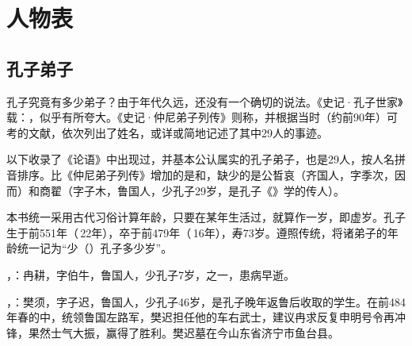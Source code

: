 \chapter*{人\quad 物\quad 表}



\lypdfbookmark\section*{孔子弟子}

孔子究竟有多少弟子？由于年代久远，还没有一个确切的说法。《史记·孔子世家》载：，似乎有所夸大。《史记·仲尼弟子列传》则称，并根据当时（约前90年）可考的文献，依次列出了姓名，或详或简地记述了其中29人的事迹。

以下收录了《论语》中出现过，并基本公认属实的孔子弟子，也是29人，按人名拼音排序。比《仲尼弟子列传》增加的是和，缺少的是公晳哀（齐国人，字季次，因而）和商翟（字子木，鲁国人，少孔子29岁，是孔子《》学的传人）。

本书统一采用古代习俗计算年龄，只要在某年生活过，就算作一岁，即虚岁。孔子生于前551年（\,22年），卒于前479年（\,16年），寿73岁。遵照传统，将诸弟子的年龄统一记为“少（）孔子多少岁”。

\bigskip

，：冉耕，字伯牛，鲁国人，少孔子7岁，之一，患病早逝。%

，：樊须，字子迟，鲁国人，少孔子46岁，是孔子晚年返鲁后收取的学生。在前484年春的中，统领鲁国左路军，樊迟担任他的车右武士，建议冉求反复申明号令再冲锋，果然士气大振，赢得了胜利。樊迟墓在今山东省济宁市鱼台县。

